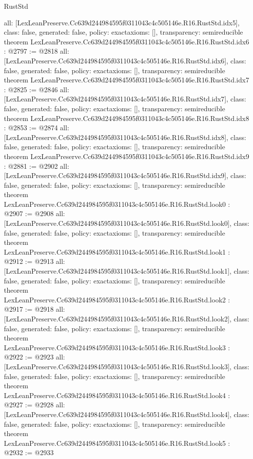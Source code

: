 \begin{lexlean}{RustStd}
\begin{coremodule}
{  all: [LexLeanPreserve.Cc639d244984595f0311043c4c505146e.R16.RustStd.idx5],
  class: false,
  generated: false,
  policy: exact{axioms: []},
  transparency: semireducible
}
theorem LexLeanPreserve.Cc639d244984595f0311043c4c505146e.R16.RustStd.idx6 : @2797 := @2818 {
  all: [LexLeanPreserve.Cc639d244984595f0311043c4c505146e.R16.RustStd.idx6],
  class: false,
  generated: false,
  policy: exact{axioms: []},
  transparency: semireducible
}
theorem LexLeanPreserve.Cc639d244984595f0311043c4c505146e.R16.RustStd.idx7 : @2825 := @2846 {
  all: [LexLeanPreserve.Cc639d244984595f0311043c4c505146e.R16.RustStd.idx7],
  class: false,
  generated: false,
  policy: exact{axioms: []},
  transparency: semireducible
}
theorem LexLeanPreserve.Cc639d244984595f0311043c4c505146e.R16.RustStd.idx8 : @2853 := @2874 {
  all: [LexLeanPreserve.Cc639d244984595f0311043c4c505146e.R16.RustStd.idx8],
  class: false,
  generated: false,
  policy: exact{axioms: []},
  transparency: semireducible
}
theorem LexLeanPreserve.Cc639d244984595f0311043c4c505146e.R16.RustStd.idx9 : @2881 := @2902 {
  all: [LexLeanPreserve.Cc639d244984595f0311043c4c505146e.R16.RustStd.idx9],
  class: false,
  generated: false,
  policy: exact{axioms: []},
  transparency: semireducible
}
theorem LexLeanPreserve.Cc639d244984595f0311043c4c505146e.R16.RustStd.look0 : @2907 := @2908 {
  all: [LexLeanPreserve.Cc639d244984595f0311043c4c505146e.R16.RustStd.look0],
  class: false,
  generated: false,
  policy: exact{axioms: []},
  transparency: semireducible
}
theorem LexLeanPreserve.Cc639d244984595f0311043c4c505146e.R16.RustStd.look1 : @2912 := @2913 {
  all: [LexLeanPreserve.Cc639d244984595f0311043c4c505146e.R16.RustStd.look1],
  class: false,
  generated: false,
  policy: exact{axioms: []},
  transparency: semireducible
}
theorem LexLeanPreserve.Cc639d244984595f0311043c4c505146e.R16.RustStd.look2 : @2917 := @2918 {
  all: [LexLeanPreserve.Cc639d244984595f0311043c4c505146e.R16.RustStd.look2],
  class: false,
  generated: false,
  policy: exact{axioms: []},
  transparency: semireducible
}
theorem LexLeanPreserve.Cc639d244984595f0311043c4c505146e.R16.RustStd.look3 : @2922 := @2923 {
  all: [LexLeanPreserve.Cc639d244984595f0311043c4c505146e.R16.RustStd.look3],
  class: false,
  generated: false,
  policy: exact{axioms: []},
  transparency: semireducible
}
theorem LexLeanPreserve.Cc639d244984595f0311043c4c505146e.R16.RustStd.look4 : @2927 := @2928 {
  all: [LexLeanPreserve.Cc639d244984595f0311043c4c505146e.R16.RustStd.look4],
  class: false,
  generated: false,
  policy: exact{axioms: []},
  transparency: semireducible
}
theorem LexLeanPreserve.Cc639d244984595f0311043c4c505146e.R16.RustStd.look5 : @2932 := @2933 {
}
\end{coremodule}
\end{lexlean}
